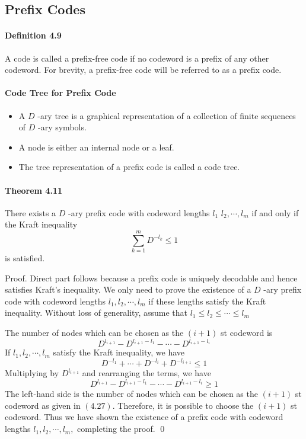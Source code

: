 \documentclass[8pt]{article}
\begin{document}
\subsection{Prefix Codes}
\paragraph{Definition 4.9} A code is called a prefix-free code if no codeword is a prefix of any other codeword. For brevity, a prefix-free code will be referred to as a prefix code.

\paragraph{Code Tree for Prefix Code}
\begin{itemize}
	\item A $D$ -ary tree is a graphical representation of a collection of finite sequences of $D$ -ary symbols.
	\item A node is either an internal node or a leaf.
	\item The tree representation of a prefix code is called a code tree.
\end{itemize}

\begin{tcolorbox}
\paragraph{Theorem 4.11} There exists a $D$ -ary prefix code with codeword lengths $l_{1}$ $l_{2}, \cdots, l_{m}$ if and only if the Kraft inequality
$$
\sum_{k=1}^{m} D^{-l_{k}} \leq 1
$$
is satisfied.
\end{tcolorbox}
Proof. Direct part follows because a prefix code is uniquely decodable and hence satisfies Kraft's inequality.
We only need to prove the existence of a $D$ -ary prefix code with codeword lengths $l_{1}, l_{2}, \cdots, l_{m}$ if these lengths satisfy the Kraft inequality. Without loss of generality, assume that $l_{1} \leq l_{2} \leq \cdots \leq l_{m}$

The number of nodes which can be chosen as the $(i+1)$ st codeword is
$$
D^{l_{i+1}}-D^{l_{i+1}-l_{1}}-\cdots-D^{l_{i+1}-l_{i}}
$$
If $l_{1}, l_{2}, \cdots, l_{m}$ satisfy the Kraft inequality, we have
$$
D^{-l_{1}}+\cdots+D^{-l_{i}}+D^{-l_{i+1}} \leq 1
$$
Multiplying by $D^{l_{i+1}}$ and rearranging the terms, we have
$$
D^{l_{i+1}}-D^{l_{i+1}-l_{1}}-\cdots-D^{l_{i+1}-l_{i}} \geq 1
$$
The left-hand side is the number of nodes which can be chosen as the $(i+1)$ st codeword as given in $(4.27) .$ Therefore, it is possible to choose the $(i+1)$ st codeword. Thus we have shown the existence of a prefix code with codeword lengths $l_{1}, l_{2}, \cdots, l_{m},$ completing the proof. \qed
\end{document}
